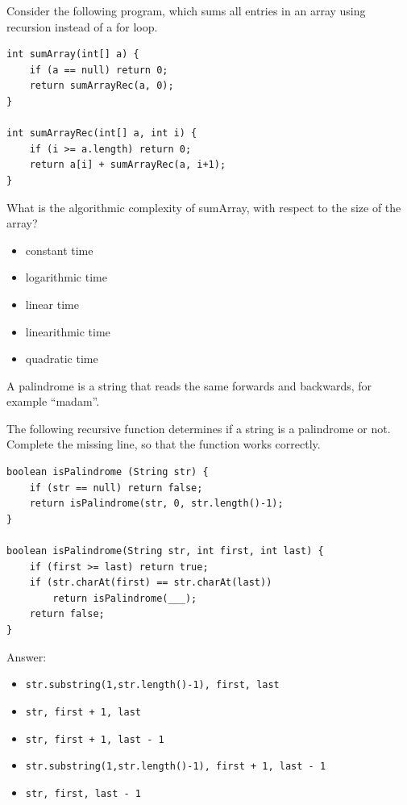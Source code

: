\begin{question}
Consider the following program, which sums all entries in an array using recursion instead of a for loop.

\begin{lstlisting}
int sumArray(int[] a) {
    if (a == null) return 0;
    return sumArrayRec(a, 0);
}

int sumArrayRec(int[] a, int i) {
    if (i >= a.length) return 0;
    return a[i] + sumArrayRec(a, i+1);
}
\end{lstlisting}

What is the algorithmic complexity of sumArray, with respect to the size of the array?
\begin{itemize}[leftmargin=2em,itemsep=1pt,topsep=2pt]
\item[\cb{0}] constant time
\item[\cb{0}] logarithmic time
\item[\cb{1}] linear time
\item[\cb{0}] linearithmic time
\item[\cb{0}] quadratic time
\end{itemize}
\end{question}

\begin{question}
A palindrome is a string that reads the same forwards and backwards, for example ``madam''.

The following recursive function determines if a string is a palindrome or not.
Complete the missing line, so that the function works correctly.

\begin{lstlisting}
boolean isPalindrome (String str) {
    if (str == null) return false;
    return isPalindrome(str, 0, str.length()-1);
}

boolean isPalindrome(String str, int first, int last) {
    if (first >= last) return true;
    if (str.charAt(first) == str.charAt(last))
        return isPalindrome(___);
    return false;
}
\end{lstlisting}

Answer:
\begin{itemize}[leftmargin=2em,itemsep=1pt,topsep=2pt]
\item[\cb{0}] \lstinline|str.substring(1,str.length()-1), first, last|
\item[\cb{0}] \lstinline|str, first + 1, last|
\item[\cb{1}] \lstinline|str, first + 1, last - 1|
\item[\cb{0}] \lstinline|str.substring(1,str.length()-1), first + 1, last - 1|
\item[\cb{0}] \lstinline|str, first, last - 1|
\end{itemize}
\end{question}
